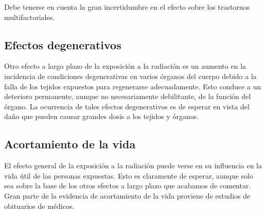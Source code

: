 \documentclass[]{article}
\begin{document}

Debe tenerse en cuenta la gran incertidumbre en el efecto sobre los trastornos multifactoriales.\\


\subsection{Efectos degenerativos} 

Otro efecto a largo plazo de la exposición a la radiación es un aumento en la incidencia de condiciones degenerativas en varios órganos del cuerpo debido a la falla de los tejidos expuestos para regenerarse adecuadamente. Esto conduce a un deterioro permanente, aunque no necesariamente debilitante, de la función del órgano. La ocurrencia
de tales efectos degenerativos es de esperar en vista del daño que pueden causar grandes dosis a los tejidos y órganos.\\

\subsection{Acortamiento de la vida} 

El efecto general de la exposición a la radiación puede verse en su influencia en la vida útil de las personas expuestas. Esto es claramente de esperar, aunque solo sea sobre la base de los otros efectos a largo plazo que acabamos de comentar. Gran parte de la evidencia de acortamiento de la vida proviene de estudios de obituarios de médicos.\\
\end{document}
